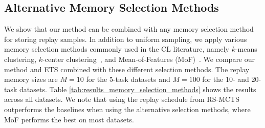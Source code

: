 
\subsection{Alternative Memory Selection Methods}
\label{sec:alternative_memory_selection_methods}

We show that our method can be combined with any memory selection method for storing replay samples. In addition to uniform sampling, we apply various memory selection methods commonly used in the CL literature, namely $k$-means clustering, $k$-center clustering~\citep{nguyen2017variational}, and Mean-of-Features (MoF)~\citep{rebuffi2017icarl}. We compare our method and ETS combined with these different selection methods. 
The replay memory sizes are $M=10$ for the 5-task datasets and $M=100$ for the 10- and 20-task datasets. 
Table \ref{tab:results_memory_selection_methods} shows the results across all datasets. 
We note that using the replay schedule from RS-MCTS outperforms the baselines when using the alternative selection methods, where MoF performs the best on most datasets. 



